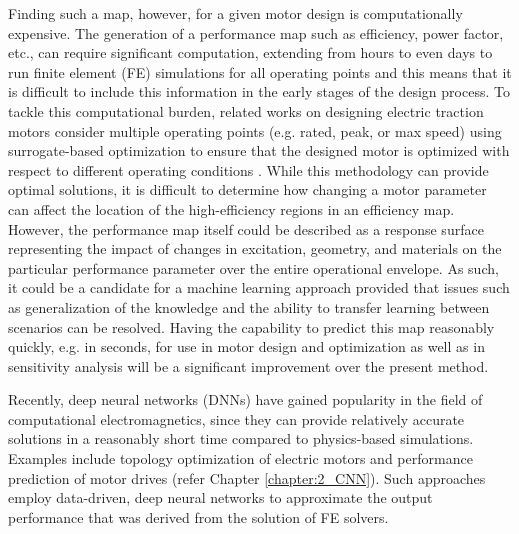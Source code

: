 Finding such a map, however, for a given motor design is computationally expensive. The generation of a performance map such as efficiency, power factor, etc., can require significant computation, extending from hours to even days to run finite element (FE) simulations for all operating points and this means that it is difficult to include this information in the early stages of the design process. To tackle this computational burden, related works on designing electric traction motors consider multiple operating points (e.g. rated, peak, or max speed) using surrogate-based optimization to ensure that the designed motor is optimized with respect to different operating conditions \parencite{silva2017multiple}. While this methodology can provide optimal solutions, it is difficult to determine how changing a motor parameter can affect the location of the high-efficiency regions in an efficiency map. However, the performance map itself could be described as a response surface representing the impact of changes in excitation, geometry, and materials on the particular performance parameter over the entire operational envelope. As such, it could be a candidate for a machine learning approach provided that issues such as generalization of the knowledge and the ability to transfer learning between scenarios can be resolved. Having the capability to predict this map reasonably quickly, e.g. in seconds, for use in motor design and optimization as well as in sensitivity analysis will be a significant improvement over the present method.

Recently, deep neural networks (DNNs) have gained popularity in the field of computational electromagnetics, since they can provide relatively accurate solutions in a reasonably short time compared to physics-based simulations. Examples include topology optimization of electric motors \parencite{asanuma2020transfer, barmada2020deep} and performance prediction of motor drives (refer Chapter \ref{chapter:2_CNN}). Such approaches employ data-driven, deep neural networks to approximate the output performance that was derived from the solution of FE solvers.

